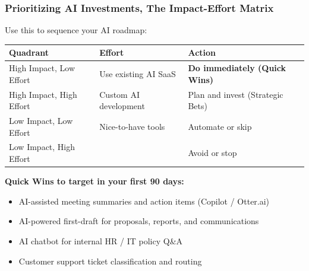 \begin{frame}[fragile]\frametitle{Prioritizing AI Investments, The Impact-Effort Matrix}

Use this to sequence your AI roadmap:
\begin{center}
\begin{tabular}{|p{2.2cm}|p{2.2cm}|p{2.2cm}|}

\hline
\textbf{Quadrant} & \textbf{Effort} & \textbf{Action} \\
\hline
High Impact, Low Effort & Use existing AI SaaS & \textbf{Do immediately (Quick Wins)} \\
High Impact, High Effort & Custom AI development & Plan and invest (Strategic Bets) \\
Low Impact, Low Effort & Nice-to-have tools & Automate or skip \\
Low Impact, High Effort & & Avoid or stop \\
\hline
\end{tabular}
\end{center}

\textbf{Quick Wins to target in your first 90 days:}
\begin{itemize}
  \item AI-assisted meeting summaries and action items (Copilot / Otter.ai)
  \item AI-powered first-draft for proposals, reports, and communications
  \item AI chatbot for internal HR / IT policy Q\&A
  \item Customer support ticket classification and routing
\end{itemize}

\end{frame}

